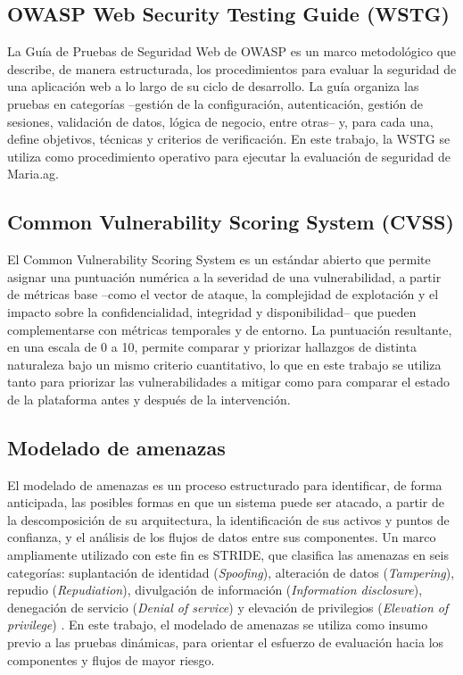 \documentclass[12pt,letterpaper]{report}
\begin{document}
\subsection*{OWASP Web Security Testing Guide (WSTG)}
La Guía de Pruebas de Seguridad Web de OWASP \autocite{owasp2024wstg} es un
marco metodológico que describe, de manera estructurada, los procedimientos
para evaluar la seguridad de una aplicación web a lo largo de su ciclo de
desarrollo. La guía organiza las pruebas en categorías --gestión de la
configuración, autenticación, gestión de sesiones, validación de datos,
lógica de negocio, entre otras-- y, para cada una, define objetivos, técnicas
y criterios de verificación. En este trabajo, la WSTG se utiliza como
procedimiento operativo para ejecutar la evaluación de seguridad de
Maria.ag.

\subsection*{Common Vulnerability Scoring System (CVSS)}
El Common Vulnerability Scoring System \autocite{first2023cvss} es un
estándar abierto que permite asignar una puntuación numérica a la severidad
de una vulnerabilidad, a partir de métricas base --como el vector de ataque,
la complejidad de explotación y el impacto sobre la confidencialidad,
integridad y disponibilidad-- que pueden complementarse con métricas
temporales y de entorno. La puntuación resultante, en una escala de 0 a 10,
permite comparar y priorizar hallazgos de distinta naturaleza bajo un mismo
criterio cuantitativo, lo que en este trabajo se utiliza tanto para priorizar
las vulnerabilidades a mitigar como para comparar el estado de la plataforma
antes y después de la intervención.

\subsection*{Modelado de amenazas}
El modelado de amenazas es un proceso estructurado para identificar, de forma
anticipada, las posibles formas en que un sistema puede ser atacado, a partir
de la descomposición de su arquitectura, la identificación de sus activos y
puntos de confianza, y el análisis de los flujos de datos entre sus
componentes. Un marco ampliamente utilizado con este fin es STRIDE, que
clasifica las amenazas en seis categorías: suplantación de identidad
(\textit{Spoofing}), alteración de datos (\textit{Tampering}), repudio
(\textit{Repudiation}), divulgación de información (\textit{Information
disclosure}), denegación de servicio (\textit{Denial of service}) y elevación
de privilegios (\textit{Elevation of privilege}) \autocite{shostack2014}. En
este trabajo, el modelado de amenazas se utiliza como insumo previo a las
pruebas dinámicas, para orientar el esfuerzo de evaluación hacia los
componentes y flujos de mayor riesgo.
\end{document}
